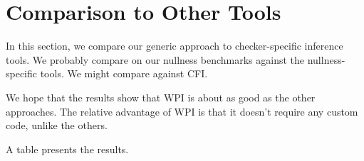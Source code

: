 \section{Comparison to Other Tools}
\label{sec:comparison}

In this section, we compare our generic approach to
checker-specific inference tools. We probably compare
on our nullness benchmarks against the nullness-specific
tools. We might compare against CFI.

We hope that the results show that WPI is about as good as
the other approaches. The relative advantage of WPI is that
it doesn't require any custom code, unlike the others.

A table presents the results.
